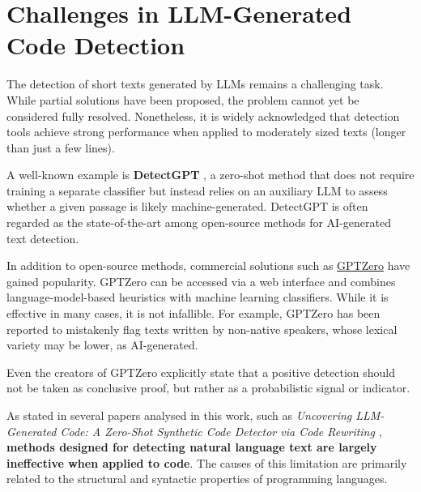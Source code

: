 \clearpage
\section{Challenges in LLM-Generated Code Detection}
The detection of short texts generated by LLMs remains 
a challenging task. While partial solutions have been 
proposed, the problem cannot yet be considered fully 
resolved. Nonetheless, it is widely acknowledged that 
detection tools achieve strong performance when applied 
to moderately sized texts (longer than just a few lines).

A well-known example is \textbf{DetectGPT}
\cite{mitchell2023detectgpt}, a 
zero-shot method that does not require training a 
separate classifier but instead relies on an 
auxiliary LLM to assess whether a given passage is 
likely machine-generated. 
DetectGPT is often regarded as the state-of-the-art 
among open-source methods for AI-generated text detection.


In addition to open-source methods, commercial 
solutions such as \href{https://gptzero.me}{GPTZero} 
have gained 
popularity. GPTZero can be accessed via a web 
interface and combines language-model-based heuristics 
with machine learning classifiers. While it is 
effective in many cases, it is not infallible. 
For example, GPTZero has been reported to mistakenly 
flag texts written by non-native speakers, 
whose lexical variety may be lower, as AI-generated.

Even the creators of GPTZero explicitly state 
that a positive detection should not be taken as 
conclusive proof, but rather as a probabilistic 
signal or indicator.

\vspace{1\baselineskip}
\noindent

As stated in several papers analysed in this work, 
such as \textit{Uncovering LLM-Generated Code: A 
Zero-Shot Synthetic Code Detector via Code Rewriting 
\cite{ye2023uncovering}}, \textbf{methods designed for 
detecting natural language text are largely 
ineffective when applied to code}. The causes of 
this limitation are primarily related to the 
structural and syntactic properties of programming 
languages. 

